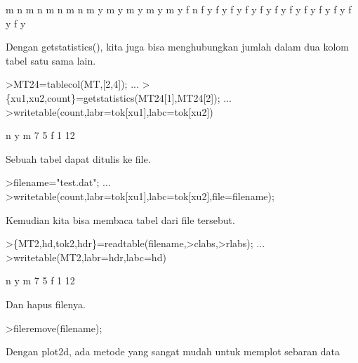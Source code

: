 \documentclass[a4paper,10pt]{article}
\begin{document}
\begin{eulernotebook}
\begin{eulercomment}
\begin{eulercomment}
\begin{euleroutput}
           m         n
           m         n
           m         n
           m         n
           m         y
           m         y
           m         y
           m         y
           m         y
           f         n
           f         y
           f         y
           f         y
           f         y
           f         y
           f         y
           f         y
           f         y
           f         y
           f         y
           f         y
           f         y
\end{euleroutput}
\begin{eulercomment}
Dengan getstatistics(), kita juga bisa menghubungkan jumlah dalam dua
kolom tabel satu sama lain.
\end{eulercomment}
\begin{eulerprompt}
>MT24=tablecol(MT,[2,4]); ...
>\{xu1,xu2,count\}=getstatistics(MT24[1],MT24[2]); ...
>writetable(count,labr=tok[xu1],labc=tok[xu2])
\end{eulerprompt}
\begin{euleroutput}
                     n         y
           m         7         5
           f         1        12
\end{euleroutput}
\begin{eulercomment}
Sebuah tabel dapat ditulis ke file.
\end{eulercomment}
\begin{eulerprompt}
>filename="test.dat"; ...
>writetable(count,labr=tok[xu1],labc=tok[xu2],file=filename);
\end{eulerprompt}
\begin{eulercomment}
Kemudian kita bisa membaca tabel dari file tersebut.
\end{eulercomment}
\begin{eulerprompt}
>\{MT2,hd,tok2,hdr\}=readtable(filename,>clabs,>rlabs); ...
>writetable(MT2,labr=hdr,labc=hd)
\end{eulerprompt}
\begin{euleroutput}
                     n         y
           m         7         5
           f         1        12
\end{euleroutput}
\begin{eulercomment}
Dan hapus filenya.
\end{eulercomment}
\begin{eulerprompt}
>fileremove(filename);
\end{eulerprompt}
\begin{eulercomment}
Dengan plot2d, ada metode yang sangat mudah untuk memplot sebaran data

\end{eulercomment}
\end{eulercomment}
\end{eulercomment}
\end{eulernotebook}
\end{document}
